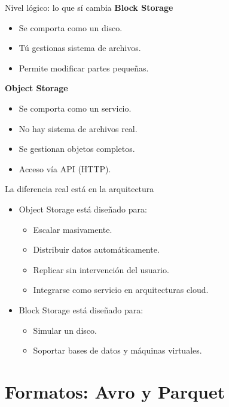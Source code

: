 \documentclass{beamer}
\begin{document}
\begin{frame}{Nivel lógico: lo que sí cambia}
\textbf{Block Storage}
\begin{itemize}
    \item Se comporta como un disco.
    \item Tú gestionas sistema de archivos.
    \item Permite modificar partes pequeñas.
\end{itemize}

\medskip

\textbf{Object Storage}
\begin{itemize}
    \item Se comporta como un servicio.
    \item No hay sistema de archivos real.
    \item Se gestionan objetos completos.
    \item Acceso vía API (HTTP).
\end{itemize}
\end{frame}

\begin{frame}{La diferencia real está en la arquitectura}
\begin{itemize}
    \item Object Storage está diseñado para:
    \begin{itemize}
        \item Escalar masivamente.
        \item Distribuir datos automáticamente.
        \item Replicar sin intervención del usuario.
        \item Integrarse como servicio en arquitecturas cloud.
    \end{itemize}
    \item Block Storage está diseñado para:
    \begin{itemize}
        \item Simular un disco.
        \item Soportar bases de datos y máquinas virtuales.
    \end{itemize}
\end{itemize}
\end{frame}


\section{Formatos: Avro y Parquet}
\end{document}

